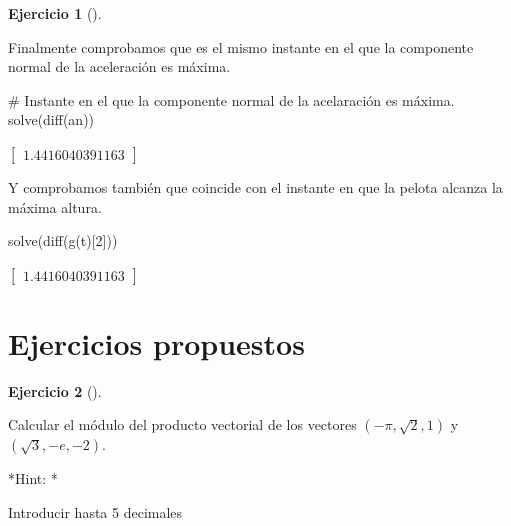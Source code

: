 \documentclass[
  a4paper,
]{scrreport}
\newenvironment{Shaded}{\begin{snugshade}}{\end{snugshade}}
\newcommand{\CommentTok}[1]{\textcolor[rgb]{0.37,0.37,0.37}{#1}}
\newcommand{\FloatTok}[1]{\textcolor[rgb]{0.68,0.00,0.00}{#1}}
\newcommand{\FunctionTok}[1]{\textcolor[rgb]{0.28,0.35,0.67}{#1}}
\newcommand{\NormalTok}[1]{\textcolor[rgb]{0.00,0.23,0.31}{#1}}
\theoremstyle{definition}
\newtheorem{exercise}{Ejercicio}[chapter]
\theoremstyle{remark}
\begin{document}
\begin{exercise}[]
\begin{enumerate}
\begin{tcolorbox}
  Finalmente comprobamos que es el mismo instante en el que la
  componente normal de la aceleración es máxima.

\begin{Shaded}
\begin{Highlighting}[]
\CommentTok{\# Instante en el que la componente normal de la acelaración es máxima.}
\FunctionTok{solve}\NormalTok{(}\FunctionTok{diff}\NormalTok{(an))}
\end{Highlighting}
\end{Shaded}

  $\left[\begin{smallmatrix}1.4416040391163\end{smallmatrix}\right]$

  Y comprobamos también que coincide con el instante en que la pelota
  alcanza la máxima altura.

\begin{Shaded}
\begin{Highlighting}[]
\FunctionTok{solve}\NormalTok{(}\FunctionTok{diff}\NormalTok{(}\FunctionTok{g}\NormalTok{(t)[}\FloatTok{2}\NormalTok{]))}
\end{Highlighting}
\end{Shaded}

  $\left[\begin{smallmatrix}1.4416040391163\end{smallmatrix}\right]$

  \end{tcolorbox}
\end{enumerate}

\end{exercise}

\section{Ejercicios propuestos}\label{ejercicios-propuestos-6}

\begin{exercise}[]\protect\hypertarget{exr-funciones-vectoriales-propuesto-1}{}\label{exr-funciones-vectoriales-propuesto-1}

Calcular el módulo del producto vectorial de los vectores
\((-\pi,\sqrt{2},1)\) y \((\sqrt{3},-e,-2)\).

\vspace{18pt}*Hint: *

Introducir hasta 5 decimales

\end{exercise}
\end{document}
